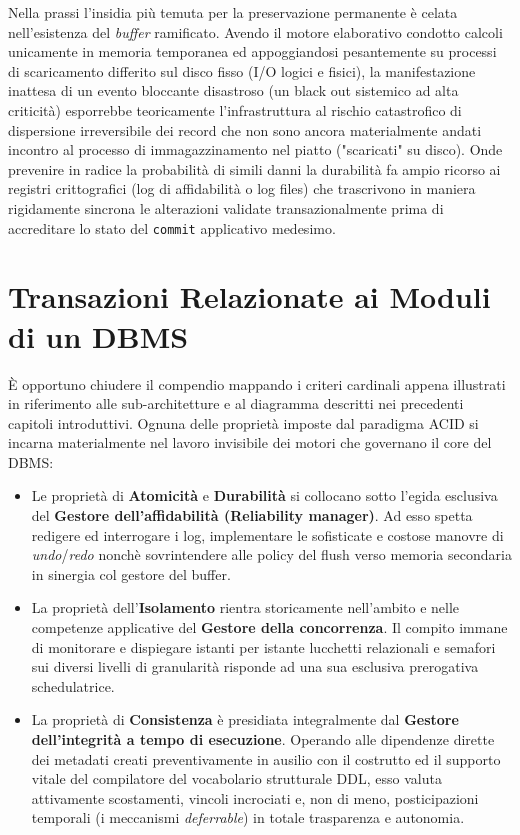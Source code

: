 Nella prassi l'insidia più temuta per la preservazione permanente è celata nell'esistenza del \textit{buffer} ramificato. Avendo il motore elaborativo condotto calcoli unicamente in memoria temporanea ed appoggiandosi pesantemente su processi di scaricamento differito sul disco fisso (I/O logici e fisici), la manifestazione inattesa di un evento bloccante disastroso (un black out sistemico ad alta criticità) esporrebbe teoricamente l'infrastruttura al rischio catastrofico di dispersione irreversibile dei record che non sono ancora materialmente andati incontro al processo di immagazzinamento nel piatto ("scaricati" su disco). Onde prevenire in radice la probabilità di simili danni la durabilità fa ampio ricorso ai registri crittografici (log di affidabilità o log files) che trascrivono in maniera rigidamente sincrona le alterazioni validate transazionalmente prima di accreditare lo stato del \texttt{commit} applicativo medesimo.

\section{Transazioni Relazionate ai Moduli di un DBMS}

È opportuno chiudere il compendio mappando i criteri cardinali appena illustrati in riferimento alle sub-architetture e al diagramma descritti nei precedenti capitoli introduttivi. Ognuna delle proprietà imposte dal paradigma ACID si incarna materialmente nel lavoro invisibile dei motori che governano il core del DBMS:

\begin{itemize}
    \item Le proprietà di \textbf{Atomicità} e \textbf{Durabilità} si collocano sotto l'egida esclusiva del \textbf{Gestore dell'affidabilità (Reliability manager)}. Ad esso spetta redigere ed interrogare i log, implementare le sofisticate e costose manovre di \textit{undo}/\textit{redo} nonchè sovrintendere alle policy del flush verso memoria secondaria in sinergia col gestore del buffer.
    \item La proprietà dell'\textbf{Isolamento} rientra storicamente nell'ambito e nelle competenze applicative del \textbf{Gestore della concorrenza}. Il compito immane di monitorare e dispiegare istanti per istante lucchetti relazionali e semafori sui diversi livelli di granularità risponde ad una sua esclusiva prerogativa schedulatrice.
    \item La proprietà di \textbf{Consistenza} è presidiata integralmente dal \textbf{Gestore dell'integrità a tempo di esecuzione}. Operando alle dipendenze dirette dei metadati creati preventivamente in ausilio con il costrutto ed il supporto vitale del compilatore del vocabolario strutturale DDL, esso valuta attivamente scostamenti, vincoli incrociati e, non di meno, posticipazioni temporali (i meccanismi \textit{deferrable}) in totale trasparenza e autonomia.
\end{itemize}
